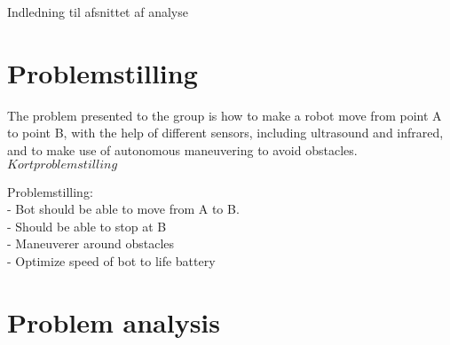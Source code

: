Indledning til afsnittet af analyse\\

\section{Problemstilling}

The problem presented to the group is how to make a robot move from point A to point B, with the help of different sensors, including ultrasound and infrared, and to make use of autonomous maneuvering to avoid obstacles. \\

$Kort problemstilling$

Problemstilling: \\
- Bot should be able to move from A to B.\\
- Should be able to stop at B\\
- Maneuverer around obstacles\\
- Optimize speed of bot to life battery

\section{Problem analysis}
